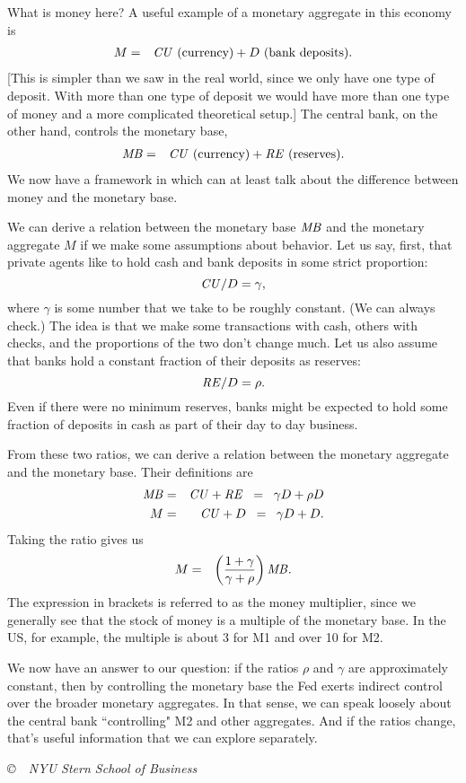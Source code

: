 \documentclass[letterpaper,12pt]{article}
\newcommand{\RE}{\mbox{\em RE\/}}
\newcommand{\MB}{\mbox{\em MB\/}}
\newcommand{\CU}{\mbox{\em CU\/}}
\begin{document}
What is money here?
A useful example of a monetary aggregate in this economy is
\begin{eqnarray*}
    M &=& \CU \mbox{ (currency)} + D \mbox{ (bank deposits)} .
\end{eqnarray*}
[This is simpler than we saw in the real world, since we only
have one type of deposit.  With more than one type of deposit we would have more than one type of money and a more complicated theoretical setup.]
The central bank, on the other hand, controls the
monetary base,
\begin{eqnarray*}
    \MB &=& \CU \mbox{ (currency)} + \RE \mbox{ (reserves)} .
\end{eqnarray*}
We now have a framework in which can at least talk about the difference
between money and the monetary base.

We can derive a relation between the monetary base $\MB$ and the monetary aggregate $M$ if we make some
assumptions about behavior. Let us say, first, that private agents like to hold cash and bank deposits in some strict proportion:
$$
                                 \CU/D  =  \gamma,
$$
where $\gamma$ is some number that we take to be roughly constant.
(We can always check.)
The idea is that we
make some transactions with cash, others with checks, and the proportions of the two don't change much.
Let us also assume that banks hold a constant fraction of their deposits as
reserves:
$$
                                 \RE/D  =  \rho .
$$
Even if there were no minimum reserves, banks might be expected to hold some fraction of deposits in cash as part of their day to day business.

From these two ratios,
we can derive a relation between the monetary aggregate and the monetary base. Their definitions are
%
\begin{eqnarray*}
               \MB  &=&   \CU + \RE
                    \;\;=\;\;   \gamma D + \rho D  \\
                M   &=&  \CU + D
                     \;\;=\;\;   \gamma D + D .
\end{eqnarray*}
Taking the ratio gives us
\begin{eqnarray*}
             M  &=& \left( \frac{1+\gamma}{\gamma+\rho} \right) \MB.
\end{eqnarray*}
The expression in brackets is referred to as the money multiplier, since we generally see that the
stock of money is a multiple of the monetary base.  In the US, for example, the multiple is about
3 for M1 and over 10 for M2.

     We now have an answer to our question:  if the ratios
$ \rho $ and $ \gamma $ are approximately constant, then by controlling the monetary base the Fed
exerts indirect control over the broader monetary aggregates.  In that sense, we can speak loosely
about the central bank ``controlling" M2 and other aggregates.
And if the ratios change, that's useful information that we can explore
separately.


\vfill \centerline{\it \copyright \ \number\year \ NYU Stern
School of Business}
\end{document}
